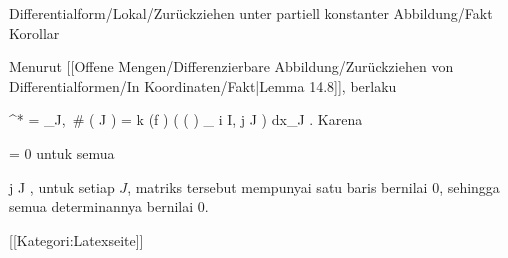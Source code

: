 {Differentialform/Lokal/Zurückziehen unter partiell konstanter Abbildung/Fakt}
{Korollar}
{}
{

\faktzusatz {}
\faktzusatz {}

}
{

Menurut
[[Offene Mengen/Differenzierbare Abbildung/Zurückziehen von Differentialformen/In Koordinaten/Fakt|Lemma 14.8]],
berlaku

\mavergleichskettedisp
{\vergleichskette
{ \varphi^* \omega
}
{ =} { \sum_{J,\, { \# \left(   J  \right) } = k} (f \circ \varphi) \cdot \det  \left(  \left(  {  }  \right) _{ i \in I, j \in J}  \right) dx_J
}
{ } {
}
{ } {
}
{ } {}
}
{}{}{.}
Karena

\mavergleichskettedisp
{\vergleichskette
{ {  }
}
{ =} { 0
}
{ } {
}
{ } {
}
{ } {
}
}
{}{}{}
untuk semua

\mavergleichskette
{\vergleichskette
{ j
}
{ \in }{ J
}
{  }{
}
{    }{
}
{   }{
}
}
{}{}{,}
untuk setiap $J$, matriks tersebut mempunyai satu baris bernilai $0$, sehingga semua determinannya bernilai $0$.

}

 [[Kategori:Latexseite]]
